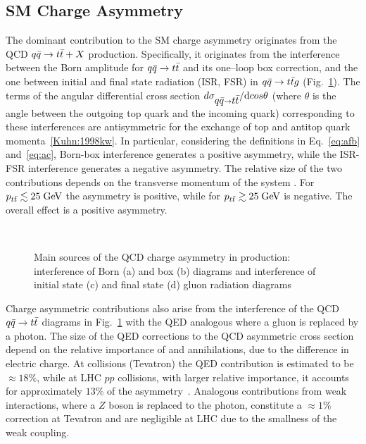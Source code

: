 \subsection{SM Charge Asymmetry}
\label{sec:qcdca}

The dominant contribution to the SM charge asymmetry originates from
the QCD $\mbox{$q\bar{q}$}{}\to\mbox{$t\bar{t}$}{}+X$ production. Specifically, it originates from the
interference between the Born amplitude for $\mbox{$q\bar{q}$}{}\to\mbox{$t\bar{t}$}{}$ and
its one--loop box correction, and the one between initial and final
state radiation (ISR, FSR) in $\mbox{$q\bar{q}$}{}\to{}\mbox{$t\bar{t}$}{}g$
(Fig.~\ref{fig:asymdiagrams}). The terms of the angular differential cross section
$d\sigma_{\mbox{$q\bar{q}$}{}\to{}\mbox{$t\bar{t}$}{}}/\mathrm{d}cos\theta$ (where $\theta$
is the angle between the outgoing top quark and the incoming quark)
corresponding to these interferences are antisymmetric for the
exchange of top and antitop quark momenta~\ref{Kuhn:1998kw}. In
particular, considering the definitions in Eq.~\ref{eq:afb}
and~\ref{eq:ac}, Born-box interference generates a positive asymmetry,
while the ISR-FSR interference generates a negative asymmetry.
The relative size of the two contributions depends on the transverse
momentum of the \ttbar{} system \pttt{}. For
$\mbox{$p_{t\bar{t}}$}{}\lesssim{}25\; \mathrm{GeV}{}$ the asymmetry is positive, while for
$\mbox{$p_{t\bar{t}}$}{}\gtrsim{}25\; \mathrm{GeV}{}$ is negative. The overall effect is a
positive asymmetry.
\begin{figure}[!htb]
  \centering
   \quad
   \\
   \quad
  \caption{Main sources of the QCD charge asymmetry in \ttbar{}
    production: interference of Born (a) and box (b) diagrams and
    interference of initial state (c) and final state (d) gluon
    radiation diagrams}
  \label{fig:asymdiagrams}
\end{figure}

Charge asymmetric contributions also arise from the interference of
the QCD $\mbox{$q\bar{q}$}{}\to{}\mbox{$t\bar{t}$}{}$ diagrams in
Fig.~\ref{fig:asymdiagrams} with the QED analogous where a gluon is
replaced by a photon. The size of the QED corrections to the QCD
asymmetric cross section depend on the relative importance of \uubar{}
and \ddbar{} annihilations, due to the difference in electric charge.
At \ppbar{} collisions (Tevatron) the QED contribution is estimated to
be $\approx{}18\%$, while at LHC $pp$ collisions, with larger relative
\ddbar{} importance, it accounts for approximately $13\%$ of the
asymmetry~\cite{Kuhn:2011ri}.
Analogous contributions from weak interactions, where a $Z$ boson is
replaced to the photon, constitute a $\approx{}1\%$ correction at
Tevatron and are negligible at LHC due to the smallness of the
weak coupling.

